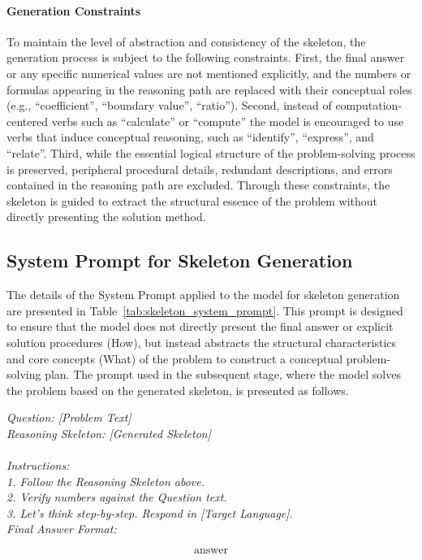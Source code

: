 \paragraph{Generation Constraints}
To maintain the level of abstraction and consistency of the skeleton, the generation process is subject to the following constraints. First, the final answer or any specific numerical values are not mentioned explicitly, and the numbers or formulas appearing in the reasoning path are replaced with their conceptual roles (e.g., ``coefficient'', ``boundary value'', ``ratio''). Second, instead of computation-centered verbs such as ``calculate'' or ``compute'' the model is encouraged to use verbs that induce conceptual reasoning, such as ``identify'', ``express'', and ``relate''. Third, while the essential logical structure of the problem-solving process is preserved, peripheral procedural details, redundant descriptions, and errors contained in the reasoning path are excluded. Through these constraints, the skeleton is guided to extract the structural essence of the problem without directly presenting the solution method.

\subsection{System Prompt for Skeleton Generation}


The details of the System Prompt applied to the model for skeleton generation are presented in Table~\ref{tab:skeleton_system_prompt}. This prompt is designed to ensure that the model does not directly present the final answer or explicit solution procedures (How), but instead abstracts the structural characteristics and core concepts (What) of the problem to construct a conceptual problem-solving plan. The prompt used in the subsequent stage, where the model solves the problem based on the generated skeleton, is presented as follows.


\begin{tcolorbox}[
width=\columnwidth,
  colback=gray!5,
  colframe=black,
  boxrule=0.6pt,
  arc=6pt,
  left=8pt,
  right=8pt,
  top=6pt,
  bottom=6pt,
  title=Solver Prompt for Skeleton
]
\small\raggedright
\textit{Question: [Problem Text]\\
Reasoning Skeleton: [Generated Skeleton]\\
\\
Instructions:\\
1. Follow the Reasoning Skeleton above.\\
2. Verify numbers against the Question text.\\
3. Let's think step-by-step. Respond in [Target Language].\\
Final Answer Format: }

\[
\boxed{\text{answer}}
\]

\end{tcolorbox}

